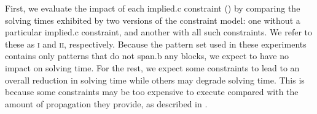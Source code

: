 \newsavebox{\solvTechPlot}
\newlength{\solvTechPlotW}
\newlength{\solvTechSubfigW}


\def\modelA{\textsc{i}}
\def\modelB{\textsc{ii}}

First, we evaluate the impact of each \gls{implied.c} \gls{constraint}
() by comparing the solving times exhibited by two versions of the
\gls{constraint model}: one without a particular \gls{implied.c}
\gls{constraint}, and another with all such \glspl{constraint}.
%
We refer to these  as \modelA{} and \modelB,
respectively.
%
Because the \gls{pattern set} used in these experiments contains only
\glspl{pattern} that do not \gls{span.b} any \glspl{block}, we expect
 to
have no impact on solving time.
%
For the rest, we expect some \glspl{constraint} to lead to an overall reduction
in solving time while others may degrade solving time.
%
This is because some \glspl{constraint} may be too expensive to execute compared
with the amount of \gls{propagation} they provide, as described in
.


